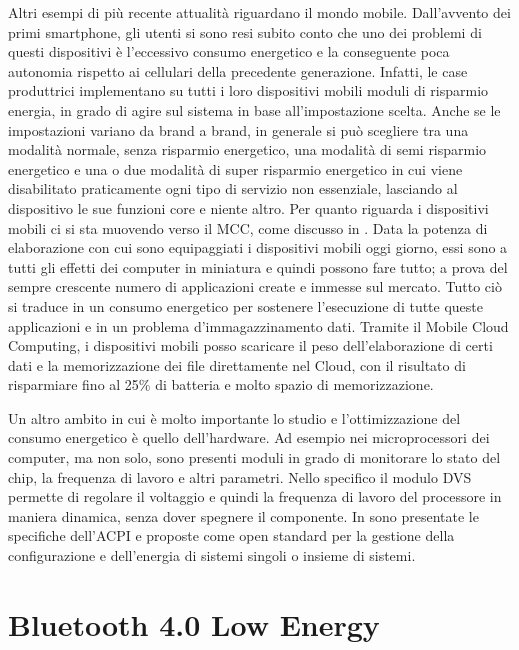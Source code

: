 Altri esempi di più recente attualità riguardano il mondo mobile. Dall'avvento dei primi smartphone, gli utenti si sono resi subito conto che uno dei problemi di questi dispositivi è l'eccessivo consumo energetico e la conseguente poca autonomia rispetto ai cellulari della precedente generazione. Infatti, le case produttrici implementano su tutti i loro dispositivi mobili moduli di risparmio energia, in grado di agire sul sistema in base all'impostazione scelta. Anche se le impostazioni variano da brand a brand, in generale si può scegliere tra una modalità normale, senza risparmio energetico, una modalità di semi risparmio energetico e una o due modalità di super risparmio energetico in cui viene disabilitato praticamente ogni tipo di servizio non essenziale, lasciando al dispositivo le sue funzioni core e niente altro. Per quanto riguarda i dispositivi mobili ci si sta muovendo verso il \acf{MCC}, come discusso in \cite{DinhLeeNiyatoWand2013-surveyMCC} . Data la potenza di elaborazione con cui sono equipaggiati i dispositivi mobili oggi giorno, essi sono a tutti gli effetti dei computer in miniatura e quindi possono fare tutto; a prova del sempre crescente numero di applicazioni create e immesse sul mercato. Tutto ciò si traduce in un consumo energetico per sostenere l'esecuzione di tutte queste applicazioni e in un problema d'immagazzinamento dati. Tramite il Mobile Cloud Computing, i dispositivi mobili posso scaricare il peso dell'elaborazione di certi dati e la memorizzazione dei file direttamente nel Cloud, con il risultato di risparmiare fino al 25\% di batteria e molto spazio di memorizzazione.

Un altro ambito in cui è molto importante lo studio e l'ottimizzazione del consumo energetico è quello dell'hardware. Ad esempio nei microprocessori dei computer, ma non solo, sono presenti moduli in grado di monitorare lo stato del chip, la frequenza di lavoro e altri parametri. Nello specifico il modulo \acf{DVS} permette di regolare il voltaggio e quindi la frequenza di lavoro del processore in maniera dinamica, senza dover spegnere il componente. In \cite{MarzollaMirandola2013-dpm} sono presentate le specifiche dell’\acf{ACPI} e proposte come open standard per la gestione della configurazione e dell’energia di sistemi singoli o insieme di sistemi.
\bigskip

 \section{Bluetooth 4.0 Low Energy}
 \label{sec:ble}
